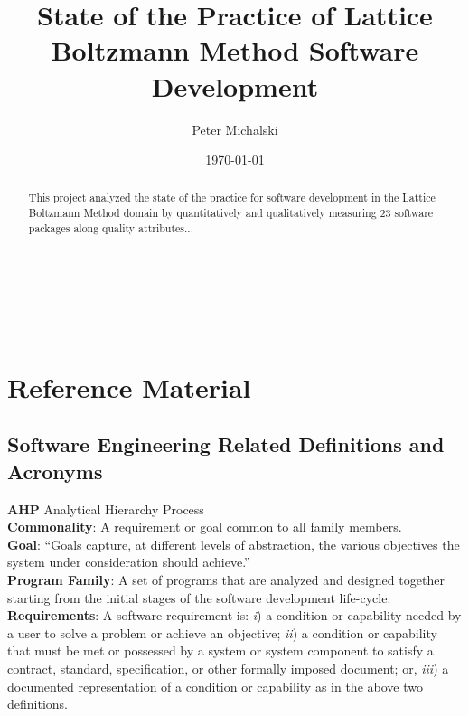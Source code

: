 \documentclass[12pt, notitlepage]{article}
\title{State of the Practice of Lattice Boltzmann Method Software Development}
\author{Peter Michalski}
\date{\today}
\begin{document}
	\maketitle
	\begin{singlespace}
	\begin{abstract}
		This project analyzed the state of the practice for software development in the Lattice Boltzmann Method 
		domain by quantitatively and qualitatively measuring 23 software packages along quality attributes...
	\end{abstract}


\newpage

\tableofcontents
{}

~\newpage

\listoffigures

\listoftables

~\newpage
{}

\clearpage
\section{Reference Material}

\subsection{Software Engineering Related Definitions and Acronyms}

\noindent\textbf{AHP} Analytical Hierarchy Process\\

\noindent\textbf{Commonality}: A requirement or goal common to all family members.\\

\noindent\textbf{Goal}: “Goals capture, at different levels of abstraction, the various objectives the system under consideration should achieve.” \citep{van2001goal}\\

\noindent\textbf{Program Family}: A set of programs that are analyzed and designed together starting from the initial stages of the software development life-cycle.\\

\noindent\textbf{Requirements}: A software requirement is: \textit{i}) a condition or capability needed by a user to solve a problem or achieve an objective; \textit{ii}) a condition or capability that must be met or possessed by a system or system component to satisfy a contract, standard, specification, or other formally imposed document; or, \textit{iii}) a documented representation of a condition or capability as in the above two definitions. \citep{thayer2000ieee}\\


\end{singlespace}
\end{document}
